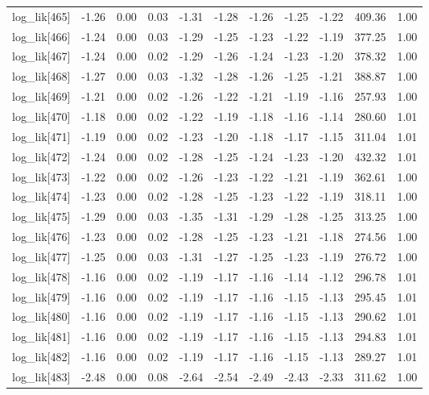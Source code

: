 \begin{table}[ht]
\begin{tabular}{rrrrrrrrrrr}
  log\_lik[465] & -1.26 & 0.00 & 0.03 & -1.31 & -1.28 & -1.26 & -1.25 & -1.22 & 409.36 & 1.00 \\ 
  log\_lik[466] & -1.24 & 0.00 & 0.03 & -1.29 & -1.25 & -1.23 & -1.22 & -1.19 & 377.25 & 1.00 \\ 
  log\_lik[467] & -1.24 & 0.00 & 0.02 & -1.29 & -1.26 & -1.24 & -1.23 & -1.20 & 378.32 & 1.00 \\ 
  log\_lik[468] & -1.27 & 0.00 & 0.03 & -1.32 & -1.28 & -1.26 & -1.25 & -1.21 & 388.87 & 1.00 \\ 
  log\_lik[469] & -1.21 & 0.00 & 0.02 & -1.26 & -1.22 & -1.21 & -1.19 & -1.16 & 257.93 & 1.00 \\ 
  log\_lik[470] & -1.18 & 0.00 & 0.02 & -1.22 & -1.19 & -1.18 & -1.16 & -1.14 & 280.60 & 1.01 \\ 
  log\_lik[471] & -1.19 & 0.00 & 0.02 & -1.23 & -1.20 & -1.18 & -1.17 & -1.15 & 311.04 & 1.01 \\ 
  log\_lik[472] & -1.24 & 0.00 & 0.02 & -1.28 & -1.25 & -1.24 & -1.23 & -1.20 & 432.32 & 1.01 \\ 
  log\_lik[473] & -1.22 & 0.00 & 0.02 & -1.26 & -1.23 & -1.22 & -1.21 & -1.19 & 362.61 & 1.00 \\ 
  log\_lik[474] & -1.23 & 0.00 & 0.02 & -1.28 & -1.25 & -1.23 & -1.22 & -1.19 & 318.11 & 1.00 \\ 
  log\_lik[475] & -1.29 & 0.00 & 0.03 & -1.35 & -1.31 & -1.29 & -1.28 & -1.25 & 313.25 & 1.00 \\ 
  log\_lik[476] & -1.23 & 0.00 & 0.02 & -1.28 & -1.25 & -1.23 & -1.21 & -1.18 & 274.56 & 1.00 \\ 
  log\_lik[477] & -1.25 & 0.00 & 0.03 & -1.31 & -1.27 & -1.25 & -1.23 & -1.19 & 276.72 & 1.00 \\ 
  log\_lik[478] & -1.16 & 0.00 & 0.02 & -1.19 & -1.17 & -1.16 & -1.14 & -1.12 & 296.78 & 1.01 \\ 
  log\_lik[479] & -1.16 & 0.00 & 0.02 & -1.19 & -1.17 & -1.16 & -1.15 & -1.13 & 295.45 & 1.01 \\ 
  log\_lik[480] & -1.16 & 0.00 & 0.02 & -1.19 & -1.17 & -1.16 & -1.15 & -1.13 & 290.62 & 1.01 \\ 
  log\_lik[481] & -1.16 & 0.00 & 0.02 & -1.19 & -1.17 & -1.16 & -1.15 & -1.13 & 294.83 & 1.01 \\ 
  log\_lik[482] & -1.16 & 0.00 & 0.02 & -1.19 & -1.17 & -1.16 & -1.15 & -1.13 & 289.27 & 1.01 \\ 
  log\_lik[483] & -2.48 & 0.00 & 0.08 & -2.64 & -2.54 & -2.49 & -2.43 & -2.33 & 311.62 & 1.00 \\ 

\end{tabular}
\end{table}
